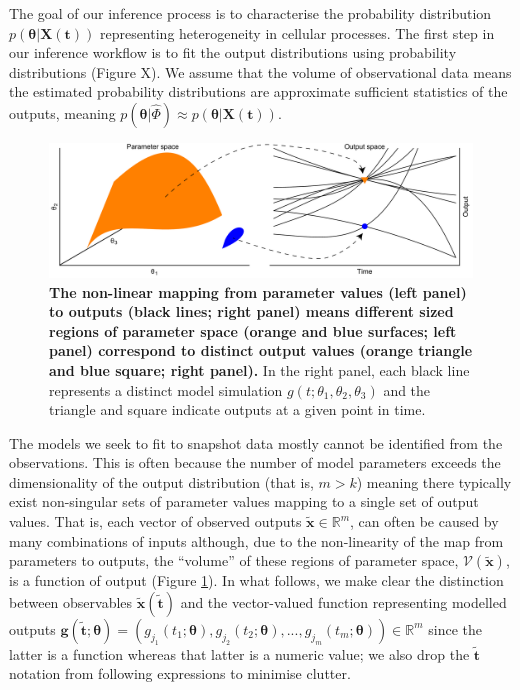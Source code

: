 \documentclass[10pt,letterpaper]{article}
\begin{document}
The goal of our inference process is to  characterise the probability distribution $p(\boldsymbol{\theta}|\boldsymbol{X}(\boldsymbol{t}))$ representing heterogeneity in cellular processes. The first step in our inference workflow is to fit the output distributions using probability distributions (Figure X). We assume that the volume of observational data means the estimated probability distributions are approximate sufficient statistics of the outputs, meaning $p(\boldsymbol{\theta}|\hat{\Phi}) \approx p(\boldsymbol{\theta}|\boldsymbol{X}(\boldsymbol{t}))$.

\begin{figure}[H]
	\centerline{\includegraphics[width=\textwidth]{../figures/contour_volumes.pdf}}
	\caption{\textbf{The non-linear mapping from parameter values (left panel) to outputs (black lines; right panel) means different sized regions of parameter space (orange and blue surfaces; left panel) correspond to distinct output values (orange triangle and blue square; right panel).} In the right panel, each black line represents a distinct model simulation $g(t; \theta_1, \theta_2, \theta_3)$ and the triangle and square indicate outputs at a given point in time.}
	\label{fig:contour_volumes}
\end{figure}


The models we seek to fit to snapshot data mostly cannot be identified from the observations. This is often because the number of model parameters exceeds the dimensionality of the output distribution (that is, $m>k$) meaning there typically exist non-singular sets of parameter values mapping to a single set of output values. That is, each vector of observed outputs $\tilde{\boldsymbol{x}}\in\mathbb{R}^m$, can often be caused by many combinations of inputs although, due to the non-linearity of the map from parameters to outputs, the ``volume'' of these regions of parameter space, $\mathcal{V}(\tilde{\boldsymbol{x}})$, is a function of output (Figure \ref{fig:contour_volumes}). In what follows, we make clear the distinction between observables $\tilde{\boldsymbol{x}}(\tilde{\boldsymbol{t}})$ and the vector-valued function representing modelled outputs $\boldsymbol{g}(\tilde{\boldsymbol{t}}; \boldsymbol{\theta})=(g_{j_1}(t_1; \boldsymbol{\theta}),g_{j_2}(t_2; \boldsymbol{\theta}),...,g_{j_m}(t_m; \boldsymbol{\theta}))\in\mathbb{R}^m$ since the latter is a function whereas that latter is a numeric value; we also drop the $\tilde{\boldsymbol{t}}$ notation from following expressions to minimise clutter.
\end{document}
